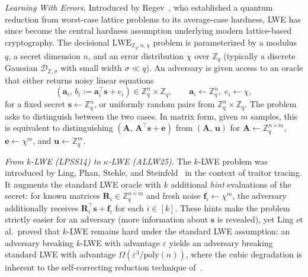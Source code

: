 \smallskip
\noindent\textit{Learning With Errors.}
Introduced by Regev~\cite{J:Regev09}, who established a quantum reduction from
worst-case lattice problems to its average-case hardness, LWE has since become
the central hardness assumption underlying modern lattice-based cryptography.
The decisional $\mathrm{LWE}_{\mathbb{Z}_q,n,\chi}$ problem is parameterized
by a modulus $q$, a secret dimension $n$, and an error distribution $\chi$ over
$\mathbb{Z}_q$ (typically a discrete Gaussian $\mathcal{D}_{\mathbb{Z},\sigma}$
with small width $\sigma \ll q$). An adversary is given access to an oracle
that either returns noisy linear equations
\[
  (\mathbf{a}_i,\, b_i := \mathbf{a}_i^\top\mathbf{s} + e_i) \in \mathbb{Z}_q^n \times \mathbb{Z}_q,
  \qquad \mathbf{a}_i \leftarrow \mathbb{Z}_q^n,\; e_i \leftarrow \chi,
\]
for a fixed secret $\mathbf{s} \leftarrow \mathbb{Z}_q^n$, or uniformly random
pairs from $\mathbb{Z}_q^n \times \mathbb{Z}_q$. The problem asks to distinguish
between the two cases. In matrix form, given $m$ samples, this is equivalent to
distinguishing $(\mathbf{A},\, \mathbf{A}^\top\mathbf{s} + \mathbf{e})$ from
$(\mathbf{A},\, \mathbf{u})$ for $\mathbf{A} \leftarrow \mathbb{Z}_q^{n\times m}$,
$\mathbf{e} \leftarrow \chi^m$, and $\mathbf{u} \leftarrow \mathbb{Z}_q^m$.

\smallskip
\noindent\textit{From $k$-LWE (LPSS14) to $\kappa$-LWE (ALLW25).}
The $k$-LWE problem was introduced by Ling, Phan, Stehle, and
Steinfeld~\cite{C:LPSS14} in the context of traitor tracing. It augments the
standard LWE oracle with $k$ additional \emph{hint} evaluations of the secret:
for known matrices $\mathbf{R}_i \in \mathbb{Z}_q^{n \times m}$ and fresh noise
$\mathbf{f}_i \leftarrow \chi^m$, the adversary additionally receives
$\mathbf{R}_i^\top\mathbf{s} + \mathbf{f}_i$ for each $i \in [k]$. These hints
make the problem strictly easier for an adversary (more information about
$\mathbf{s}$ is revealed), yet Ling et al.\ proved that $k$-LWE remains hard
under the standard LWE assumption: an adversary breaking $k$-LWE with advantage
$\varepsilon$ yields an adversary breaking standard LWE with advantage
$\Omega(\varepsilon^3/\mathrm{poly}(n))$, where the cubic degradation is
inherent to the self-correcting reduction technique of~\cite{C:LPSS14}.

